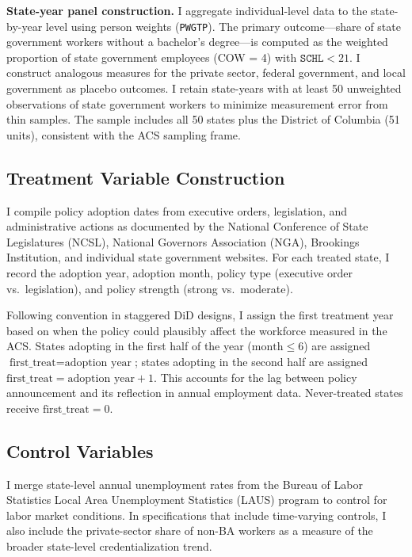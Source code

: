 \documentclass[12pt]{article}
\begin{document}
\textbf{State-year panel construction.} I aggregate individual-level data to the state-by-year level using person weights (\texttt{PWGTP}). The primary outcome---share of state government workers without a bachelor's degree---is computed as the weighted proportion of state government employees (COW = 4) with $\texttt{SCHL} < 21$. I construct analogous measures for the private sector, federal government, and local government as placebo outcomes. I retain state-years with at least 50 unweighted observations of state government workers to minimize measurement error from thin samples. The sample includes all 50 states plus the District of Columbia (51 units), consistent with the ACS sampling frame.

\subsection{Treatment Variable Construction}

I compile policy adoption dates from executive orders, legislation, and administrative actions as documented by the National Conference of State Legislatures (NCSL), National Governors Association (NGA), Brookings Institution, and individual state government websites. For each treated state, I record the adoption year, adoption month, policy type (executive order vs.\ legislation), and policy strength (strong vs.\ moderate).

Following convention in staggered DiD designs, I assign the first treatment year based on when the policy could plausibly affect the workforce measured in the ACS. States adopting in the first half of the year ($\text{month} \leq 6$) are assigned $\text{first\_treat} = \text{adoption year}$; states adopting in the second half are assigned $\text{first\_treat} = \text{adoption year} + 1$. This accounts for the lag between policy announcement and its reflection in annual employment data. Never-treated states receive $\text{first\_treat} = 0$.

\subsection{Control Variables}

I merge state-level annual unemployment rates from the Bureau of Labor Statistics Local Area Unemployment Statistics (LAUS) program to control for labor market conditions. In specifications that include time-varying controls, I also include the private-sector share of non-BA workers as a measure of the broader state-level credentialization trend.
\end{document}
